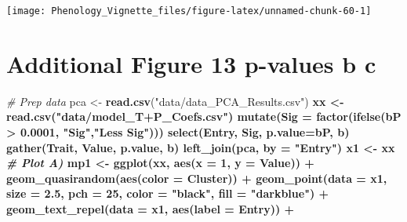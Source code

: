 \documentclass[
]{article}
\newenvironment{Shaded}{\begin{snugshade}}{\end{snugshade}}
\newcommand{\CommentTok}[1]{\textcolor[rgb]{0.56,0.35,0.01}{\textit{#1}}}
\newcommand{\DataTypeTok}[1]{\textcolor[rgb]{0.13,0.29,0.53}{#1}}
\newcommand{\DecValTok}[1]{\textcolor[rgb]{0.00,0.00,0.81}{#1}}
\newcommand{\FloatTok}[1]{\textcolor[rgb]{0.00,0.00,0.81}{#1}}
\newcommand{\KeywordTok}[1]{\textcolor[rgb]{0.13,0.29,0.53}{\textbf{#1}}}
\newcommand{\NormalTok}[1]{#1}
\newcommand{\OperatorTok}[1]{\textcolor[rgb]{0.81,0.36,0.00}{\textbf{#1}}}
\newcommand{\StringTok}[1]{\textcolor[rgb]{0.31,0.60,0.02}{#1}}
\begin{document}
\texttt{[image: Phenology\_Vignette\_files/figure-latex/unnamed-chunk-60-1]}

\hypertarget{additional-figure-13-p-values-b-c}{%
\section{Additional Figure 13 p-values b
c}\label{additional-figure-13-p-values-b-c}}

\begin{Shaded}
\begin{Highlighting}[]
\CommentTok{# Prep data}
\NormalTok{pca <-}\StringTok{ }\KeywordTok{read.csv}\NormalTok{(}\StringTok{"data/data_PCA_Results.csv"}\NormalTok{) }\OperatorTok{%
\NormalTok{xx <-}\StringTok{ }\KeywordTok{read.csv}\NormalTok{(}\StringTok{"data/model_T+P_Coefs.csv"}\NormalTok{) }\OperatorTok{%
\StringTok{  }\KeywordTok{mutate}\NormalTok{(}\DataTypeTok{Sig =} \KeywordTok{factor}\NormalTok{(}\KeywordTok{ifelse}\NormalTok{(bP }\OperatorTok{>}\StringTok{ }\FloatTok{0.0001}\NormalTok{, }\StringTok{"Sig"}\NormalTok{,}\StringTok{"Less Sig"}\NormalTok{))) }\OperatorTok{%
\StringTok{  }\KeywordTok{select}\NormalTok{(Entry, Sig, }\DataTypeTok{p.value=}\NormalTok{bP, b) }\OperatorTok{%
\StringTok{  }\KeywordTok{gather}\NormalTok{(Trait, Value, p.value, b) }\OperatorTok{%
\StringTok{  }\KeywordTok{left_join}\NormalTok{(pca, }\DataTypeTok{by =} \StringTok{"Entry"}\NormalTok{)}
\NormalTok{x1 <-}\StringTok{ }\NormalTok{xx }\OperatorTok{%
\CommentTok{# Plot A)}
\NormalTok{mp1 <-}\StringTok{ }\KeywordTok{ggplot}\NormalTok{(xx, }\KeywordTok{aes}\NormalTok{(}\DataTypeTok{x =} \DecValTok{1}\NormalTok{, }\DataTypeTok{y =}\NormalTok{ Value)) }\OperatorTok{+}
\StringTok{  }\KeywordTok{geom_quasirandom}\NormalTok{(}\KeywordTok{aes}\NormalTok{(}\DataTypeTok{color =}\NormalTok{ Cluster)) }\OperatorTok{+}
\StringTok{    }\KeywordTok{geom_point}\NormalTok{(}\DataTypeTok{data =}\NormalTok{ x1, }\DataTypeTok{size =} \FloatTok{2.5}\NormalTok{, }\DataTypeTok{pch =} \DecValTok{25}\NormalTok{, }\DataTypeTok{color =} \StringTok{"black"}\NormalTok{, }\DataTypeTok{fill =} \StringTok{"darkblue"}\NormalTok{) }\OperatorTok{+}
\StringTok{  }\KeywordTok{geom_text_repel}\NormalTok{(}\DataTypeTok{data =}\NormalTok{ x1, }\KeywordTok{aes}\NormalTok{(}\DataTypeTok{label =}\NormalTok{ Entry)) }\OperatorTok{+}
}}}}}}
\end{Highlighting}
\end{Shaded}
\end{document}
